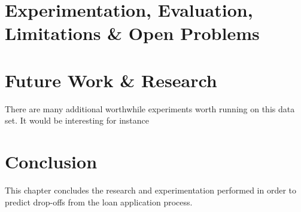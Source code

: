 \section{Experimentation, Evaluation, Limitations \& Open Problems}


\section{Future Work \& Research}
There are many additional worthwhile experiments worth running on this data set. It would be interesting for instance



\section{Conclusion}
This chapter concludes the research and experimentation performed in order to predict drop-offs from the loan application process. 

